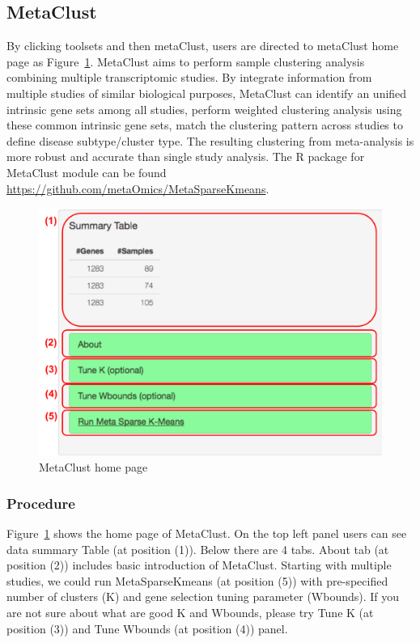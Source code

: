 \subsection{MetaClust}
By clicking toolsets and then metaClust,
users are directed to metaClust home page as Figure~\ref{fig:metaClustHome}.
MetaClust \citep{huo2016meta} aims to perform sample clustering analysis combining multiple transcriptomic studies.
By integrate information from multiple studies of similar biological purposes,
MetaClust can identify an unified intrinsic gene sets among all studies, perform weighted clustering analysis using these common intrinsic gene sets,
match the clustering pattern across studies to define disease subtype/cluster type.
The resulting clustering from meta-analysis is more robust and accurate than single study analysis.
The R package for MetaClust module can be found \url{https://github.com/metaOmics/MetaSparseKmeans}.


\begin{figure}[H]
\begin{center}
\includegraphics[scale=0.4]{./figure/metaClust/metaClustHome.pdf}
\caption{MetaClust home page}
\label{fig:metaClustHome}
\end{center}
\end{figure}

\subsubsection{Procedure}

Figure~\ref{fig:metaClustHome} shows the home page of MetaClust.
On the top left panel users can see data summary Table (at position {\color{red} (1)}).
Below there are 4 tabs. 
About tab (at position {\color{red} (2)}) includes basic introduction of MetaClust.
Starting with multiple studies, 
we could run MetaSparseKmeans (at position {\color{red} (5)}) with pre-specified number of clusters (K) and gene selection tuning parameter (Wbounds).
If you are not sure about what are good K and Wbounds, please try Tune K (at position {\color{red} (3)}) and Tune Wbounds (at position {\color{red} (4)}) panel.

